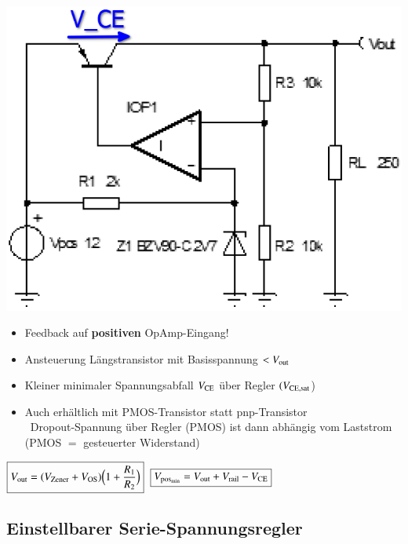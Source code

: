 \begin{minipage}[t]{0.25\columnwidth}
    \includegraphics[align=t, width=\columnwidth]{images/ldo_pnp_transistor.png}
\end{minipage}\hfill%
\begin{minipage}[t]{0.74\columnwidth}
    \begin{itemize}
        \item Feedback auf \textbf{positiven} OpAmp-Eingang!
        \item Ansteuerung Längstransistor mit Basisspannung $< V_{\rm out}$
        \item Kleiner minimaler Spannungsabfall $V_{\rm CE}$ über Regler $(V_{\rm CE,sat}$)
        \item Auch erhältlich mit PMOS-Transistor statt pnp-Transistor\\
            \textrightarrow\ Dropout-Spannung über Regler (PMOS) ist dann 
            abhängig vom Laststrom (PMOS $=$ gesteuerter Widerstand)
    \end{itemize}
\end{minipage}
$ \boxed{ V_{\rm out} = (V_{\rm Zener} + V_{\rm OS}) \Big( 1 + \frac{R_1}{R_2} \Big) }$
$ \boxed{V_{\rm pos_{min}} = V_{\rm out} + V_{\rm rail} - V_{\rm CE}}$


\subsection{Einstellbarer Serie-Spannungsregler}

